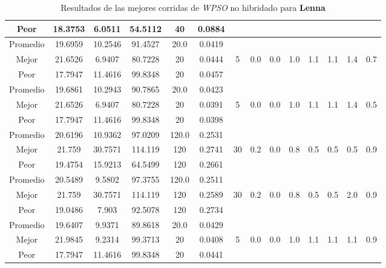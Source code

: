 \begin{table}[h!]
\begin{center}
\begin{tabular}{|c|c|c|c|c|c|c|c|c|c|c|c|c|c|}
            \cline{1-6}
            Peor & 18.3753 & 6.0511  & 54.5112 & 40 & 0.0884 &  &  &  &  &  &  &  & \\
        \hline
        \hline
            Promedio  & 19.6959 & 10.2546 & 91.4527 & 20.0 & 0.0419 &  &  &  &  &  &  &  & \\
            \cline{1-6}
            Mejor & 21.6526 & 6.9407  & 80.7228 & 20 & 0.0444 & 5 & 0.0 & 0.0 & 1.0 & 1.1 & 1.1 & 1.4 & 0.7\\
            \cline{1-6}
            Peor & 17.7947 & 11.4616  & 99.8348 & 20 & 0.0457 &  &  &  &  &  &  &  & \\
        \hline
        \hline
            Promedio  & 19.6861 & 10.2943 & 90.7865 & 20.0 & 0.0423 &  &  &  &  &  &  &  & \\
            \cline{1-6}
            Mejor & 21.6526 & 6.9407  & 80.7228 & 20 & 0.0391 & 5 & 0.0 & 0.0 & 1.0 & 1.1 & 1.1 & 1.4 & 0.5\\
            \cline{1-6}
            Peor & 17.7947 & 11.4616  & 99.8348 & 20 & 0.0398 &  &  &  &  &  &  &  & \\
        \hline
        \hline
            Promedio  & 20.6196 & 10.9362 & 97.0209 & 120.0 & 0.2531 &  &  &  &  &  &  &  & \\
            \cline{1-6}
            Mejor & 21.759 & 30.7571  & 114.119 & 120 & 0.2741 & 30 & 0.2 & 0.0 & 0.8 & 0.5 & 0.5 & 0.5 & 0.9\\
            \cline{1-6}
            Peor & 19.4754 & 15.9213  & 64.5499 & 120 & 0.2661 &  &  &  &  &  &  &  & \\
        \hline
        \hline
            Promedio  & 20.5489 & 9.5802 & 97.3755 & 120.0 & 0.2511 &  &  &  &  &  &  &  & \\
            \cline{1-6}
            Mejor & 21.759 & 30.7571  & 114.119 & 120 & 0.2589 & 30 & 0.2 & 0.0 & 0.8 & 0.5 & 0.5 & 2.0 & 0.9\\
            \cline{1-6}
            Peor & 19.0486 & 7.903  & 92.5078 & 120 & 0.2734 &  &  &  &  &  &  &  & \\
        \hline
        \hline
            Promedio  & 19.6407 & 9.9371 & 89.8618 & 20.0 & 0.0429 &  &  &  &  &  &  &  & \\
            \cline{1-6}
            Mejor & 21.9845 & 9.2314  & 99.3713 & 20 & 0.0408 & 5 & 0.0 & 0.0 & 1.0 & 1.1 & 1.1 & 1.1 & 0.9\\
            \cline{1-6}
            Peor & 17.7947 & 11.4616  & 99.8348 & 20 & 0.0441 &  &  &  &  &  &  &  & \\
        \hline
        \end{tabular}
        \caption{Resultados de las mejores corridas de \emph{WPSO} no hibridado para {\bf Lenna}}
        \label{tb:tablewpsoalgimg}
    \end{center}
\end{table}


